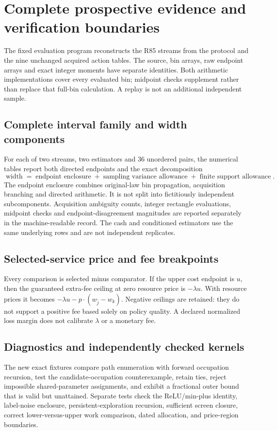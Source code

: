 \section{Complete prospective evidence and verification boundaries}\label{app:evidence86}
The fixed evaluation program reconstructs the R85 streams from the protocol and the nine unchanged acquired action tables. The source, bin arrays, raw endpoint arrays and exact integer moments have separate identities. Both arithmetic implementations cover every evaluated bin; midpoint checks supplement rather than replace that full-bin calculation. A replay is not an additional independent sample.

\subsection{Complete interval family and width components}
For each of two streams, two estimators and 36 unordered pairs, the numerical tables report both directed endpoints and the exact decomposition
\[
 \operatorname{width}=\operatorname{endpoint\ enclosure}
 +\operatorname{sampling\ variance\ allowance}
 +\operatorname{finite\ support\ allowance}.
\]
The endpoint enclosure combines original-law bin propagation, acquisition branching and directed arithmetic. It is not split into fictitiously independent subcomponents. Acquisition ambiguity counts, integer rectangle evaluations, midpoint checks and endpoint-disagreement magnitudes are reported separately in the machine-readable record. The cash and conditioned estimators use the same underlying rows and are not independent replicates.



\subsection{Selected-service price and fee breakpoints}
Every comparison is selected minus comparator. If the upper cost endpoint is $u$, then the guaranteed extra-fee ceiling at zero resource price is $-\lambda u$. With resource prices it becomes $-\lambda u-p\cdot(w_{\widehat j}-w_k)$. Negative ceilings are retained: they do not support a positive fee based solely on policy quality. A declared normalized loss margin does not calibrate $\lambda$ or a monetary fee.



\subsection{Diagnostics and independently checked kernels}
The new exact fixtures compare path enumeration with forward occupation recursion, test the candidate-occupation counterexample, retain ties, reject impossible shared-parameter assignments, and exhibit a fractional outer bound that is valid but unattained. Separate tests check the ReLU/min-plus identity, label-noise enclosure, persistent-exploration recursion, sufficient screen closure, correct lower-versus-upper work comparison, dated allocation, and price-region boundaries.

